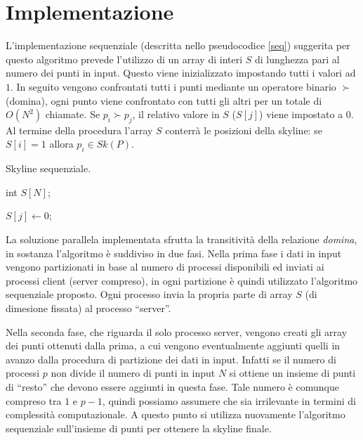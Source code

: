 \documentclass[a4paper, 11pt]{article}
\theoremstyle{definition}
\theoremstyle{remark}
\begin{document}
\section{Implementazione}
L'implementazione sequenziale (descritta nello pseudocodice \ref{seq})
suggerita per questo algoritmo prevede l'utilizzo
di un array di interi $S$ di lunghezza pari al numero dei punti in input.
Questo viene inizializzato impostando tutti i valori ad $1$. In seguito
vengono confrontati tutti i punti mediante un operatore binario $\succ$
(domina), ogni
punto viene confrontato con tutti gli altri per un totale di $O(N^2)$ chiamate.
Se $p_i \succ p_j$, il relativo valore in $S$ ($S[j]$) viene impostato a $0$.
Al termine della procedura l'array $S$ conterrà le posizioni della skyline:
se $S[i] = 1$ allora $p_i \in Sk(P)$.

\begin{algorithm}
\caption{Skyline sequenziale.}
\label{seq}
\begin{algorithmic}
\State int $S[N]$;
\EndFor

         \State $S[j] \gets 0$;
      \EndIf
   \EndFor
\EndFor
\EndFunction
\end{algorithmic}
\end{algorithm}

La soluzione parallela implementata sfrutta la transitività della relazione
\emph{domina}, in sostanza l'algoritmo è suddiviso in due fasi. Nella
prima fase i dati in input vengono partizionati in base al numero di processi
disponibili ed inviati ai processi client (server compreso),
in ogni partizione è quindi utilizzato l'algoritmo sequenziale proposto.
Ogni processo invia la propria parte di array $S$  (di dimesione fissata)
al processo ``server''.

Nella seconda fase, che riguarda il solo processo server,
vengono creati gli array dei punti ottenuti dalla prima,
a cui vengono eventualmente aggiunti quelli in avanzo dalla procedura di
partizione dei dati in input. Infatti se il numero di processi $p$ non divide
il numero di punti in input $N$ si ottiene un insieme di punti di ``resto'' che
devono essere aggiunti in questa fase. Tale numero è comunque compreso tra $1$
e $p-1$, quindi possiamo assumere che sia irrilevante in termini di complessità
computazionale. A questo punto si utilizza nuovamente l'algoritmo sequenziale
sull'insieme di punti per ottenere la skyline finale.
\end{document}
